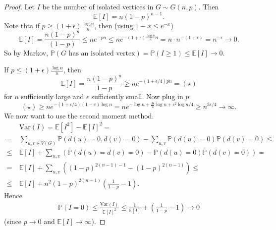 \documentclass{article}
\theoremstyle{definition}
\begin{document}
\begin{proof}
    Let $I$ be the number of isolated vertices in $G \sim G(n,p)$. Then \[
    \mathbb{E}[I]=n(1-p)^{n-1}.
    \]
    Note thta if $p \ge (1+\epsilon)\frac{\log n}{n}$, then (using $1-x \le e^{-x}$) \[
        \mathbb{E}[I] = \frac{n(1-p)^n}{(1-p)} \le ne^{-pn} \le ne^{-(1+\epsilon)\frac{\log n}{n}n} = n \cdot n^{-(1+\epsilon)} = n^{-\epsilon} \to 0.
    \]
    So by Markov, $\mathbb{P}(G \text{ has an isolated vertex})= \mathbb{P}(I \ge 1) \le \mathbb{E}[I] \to 0$.
    \vspace{1mm}
    
    If $p\le (1+\epsilon)\frac{\log n}{n}$, then \[
    \mathbb{E}[I]=\frac{n(1-p)^{n}}{1-p} \ge ne^{-(1+\epsilon/4)pn} = (\star)
    \]
    for $n$ sufficiently large and $\epsilon$ sufficiently small. Now plug in $p$:
    \[
    (\star) \ge n e^{-(1+\epsilon/4)(1-e)\log n} = n e^{-\log n + \frac{3\epsilon}{4}\log n + \epsilon^2 \log n/4} \ge n^{3\epsilon/4} \to \infty.
    \]
    We now want to use the second moment method. 
    \begin{align*}
        &\text{Var}(I)=\mathbb{E}[I^2]-\mathbb{E}[I]^2 = \\
        =&\sum_{u,v \in V(G)}^{} \mathbb{P}(d(u)=0, d(v)=0) - \sum_{u,v}^{}  \mathbb{P}(d(u)=0)\mathbb{P}(d(v)=0) \le \\
        \le~ &\mathbb{E}[I] + \sum_{u,v}^{} \left(\mathbb{P}(d(u)=d(v)=0)-\mathbb{P}(d(u)=0)\mathbb{P}(d(v)=0)\right) = \\
        =~ &\mathbb{E}[I] + \sum_{u,v}^{} \left((1-p)^{2(n-1)-1} - (1-p)^{2(n-1)}\right) \le \\
        \le~ &\mathbb{E}[I] + n^2(1-p)^{2(n-1)} \left(\frac{1}{1-p}-1\right).
    \end{align*}
    Hence
    \begin{align*}
        \mathbb{P}(I=0) \le \frac{\text{Var}(I)}{\mathbb{E}[I]^2} \le \frac{1}{\mathbb{E}[I]} + \left(\frac{1}{1-p}-1\right) \to 0
    \end{align*}
    (since $p \to 0$ and $\mathbb{E}[I]\to \infty$).
\end{proof}
\end{document}
